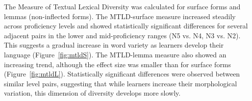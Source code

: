 
The Measure of Textual Lexical Diversity was calculated for surface forms and lemmas (non-inflected forms). The
MTLD-surface measure increased steadily across proficiency levels and showed statistically significant differences
for several adjacent pairs in the lower and mid-proficiency ranges (N5 vs. N4, N3 vs. N2). This suggests a gradual
increase in word variety as learners develop their language (Figure~\ref{fig:mtldS}). The MTLD-lemma measure also
showed an increasing trend, although the effect size was smaller than for surface forms (Figure~\ref{fig:mtldL}). Statistically
significant
differences were observed between similar level pairs, suggesting that while learners increase their morphological
variation, this dimension of diversity develops more slowly.


